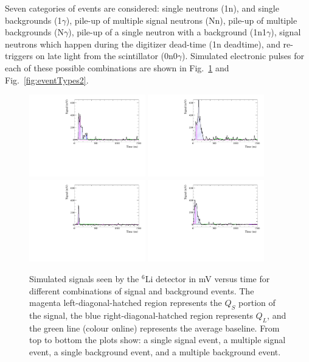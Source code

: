 \documentclass[twocolumn]{bmcart}
\begin{document}
Seven categories of events are considered: single neutrons (1n), and
single backgrounds (1$\gamma$), pile-up of multiple signal neutrons
(Nn), pile-up of multiple backgrounds (N$\gamma$), pile-up of a single
neutron with a background (1n1$\gamma$), signal neutrons which happen
during the digitizer dead-time (1n deadtime), and re-triggers on late
light from the scintillator (0n0$\gamma$).  Simulated electronic
pulses for each of these possible combinations are shown in
Fig.~\ref{fig:eventTypes} and Fig.~\ref{fig:eventTypes2}.

\begin{figure}[!htpb]
\centering
\includegraphics[width=0.45\textwidth]{figures/signal1.pdf}
\includegraphics[width=0.45\textwidth]{figures/signalN.pdf}
\includegraphics[width=0.45\textwidth]{figures/gamma1.pdf}
\includegraphics[width=0.45\textwidth]{figures/gammapileup1.pdf}
\caption{ Simulated signals seen by the $^{6}$Li detector in mV versus
  time for different combinations of signal and background events.
  The magenta left-diagonal-hatched region represents the $Q_S$
  portion of the signal, the blue right-diagonal-hatched region
  represents $Q_L$, and the green line (colour online) represents the
  average baseline.  From top to bottom the plots show: a single
  signal event, a multiple signal event, a single background event,
  and a multiple background event. }\label{fig:eventTypes}
\end{figure}
\end{document}
